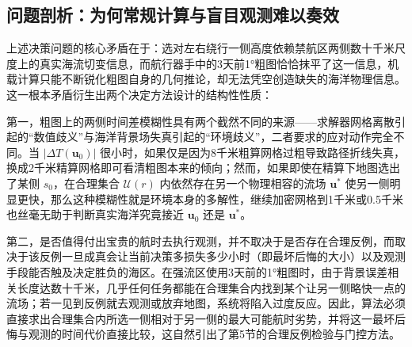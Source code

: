 \subsection{问题剖析：为何常规计算与盲目观测难以奏效}
上述决策问题的核心矛盾在于：选对左右绕行一侧高度依赖禁航区两侧数十千米尺度上的真实海流切变信息，而航行器手中的3天前1°粗图恰恰抹平了这一信息，机载计算只能不断锐化粗图自身的几何推论，却无法凭空创造缺失的海洋物理信息。这一根本矛盾衍生出两个决定方法设计的结构性性质：

第一，粗图上的两侧时间差模糊性具有两个截然不同的来源——求解器网格离散引起的“数值歧义”与海洋背景场失真引起的“环境歧义”，二者要求的应对动作完全不同。当 $|\Delta T(\boldsymbol{u}_0)|$ 很小时，如果仅是因为8千米粗算网格过粗导致路径折线失真，换成2千米精算网格即可看清粗图本来的倾向；然而，如果即使在精算下地图选出了某侧 $s_0$，在合理集合 $\mathcal{U}(r)$ 内依然存在另一个物理相容的流场 $\boldsymbol{u}^*$ 使另一侧明显更快，那么这种模糊性就是环境本身的多解性，继续加密网格到1千米或0.5千米也丝毫无助于判断真实海洋究竟接近 $\boldsymbol{u}_0$ 还是 $\boldsymbol{u}^*$。

第二，是否值得付出宝贵的航时去执行观测，并不取决于是否存在合理反例，而取决于该反例一旦成真会让当前决策多损失多少小时（即最坏后悔的大小）以及观测手段能否触及决定胜负的海区。在强流区使用3天前的1°粗图时，由于背景误差相关长度达数十千米，几乎任何任务都能在合理集合内找到某个让另一侧略快一点的流场；若一见到反例就去观测或放弃地图，系统将陷入过度反应。因此，算法必须直接求出合理集合内所选一侧相对于另一侧的最大可能航时劣势，并将这一最坏后悔与观测的时间代价直接比较，这自然引出了第5节的合理反例检验与门控方法。
